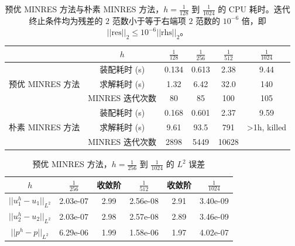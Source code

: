 \documentclass[lang=cn,11pt,a4paper]{elegantpaper}
\begin{document}
\begin{table}[H]
    \centering
    \begin{tabular}{c|ccccc}
    \hline
                                        & $h$               & $\frac{1}{128}$  & $\frac{1}{256}$ & $\frac{1}{512}$  & $\frac{1}{1024}$ \\ \hline
    \multirow{3}{*}{预优 MINRES 方法}    & 装配耗时 (s)     &   0.134   & 0.613            &   2.38   &  9.44              \\
                                        & 求解耗时 (s)       &   1.32   & 6.42            &   32.0   &  140              \\
                                        & MINRES 迭代次数        &   80   & 85             &   100   &  105             \\ \hline
    \multirow{3}{*}{朴素 MINRES 方法} & 装配耗时 (s)        &  0.168    & 0.601         &  2.37    &  9.59             \\
                                    & 求解耗时 (s)         &   9.61   &   93.5     &   791   &    >1h, killed   \\
                                    & MINRES 迭代次数          &   2898   &  5449     &   10628   &                \\ \hline
    \end{tabular}
    \caption{\small 预优 MINRES 方法与朴素 MINRES 方法，$h=\frac{1}{128}$ 到 $\frac{1}{1024}$ 的 CPU 耗时。迭代终止条件均为残差的 $2$ 范数小于等于右端项 $2$ 范数的 $10^{-6}$ 倍，即 $||\text{res}||_2\leq 10^{-6}||\text{rhs}||_2$。}
\end{table}

\begin{table}[H]
    \centering
    \begin{tabular}{cccccc}
    \hline
         $h$               & $\frac{1}{256}$ & 收敛阶  & $\frac{1}{512}$ & 收敛阶  & $\frac{1}{1024}$ \\ \hline
         $||u_1^h-u_1||_{L^2}$ & 2.03e-07        & 2.99 & 2.56e-08        & 2.91 & 3.40e-09         \\
         $||u_2^h-u_2||_{L^2}$ & 2.03e-07        & 2.98 & 2.57e-08        & 2.89 & 3.46e-09         \\
         $||p^h-p||_{L^2}$     & 6.29e-06        & 1.99 & 1.58e-06        & 1.97 & 4.02e-07         \\ \hline
    \end{tabular}
    \caption{\small 预优 MINRES 方法，$h=\frac{1}{256}$ 到 $\frac{1}{1024}$ 的 $L^2$ 误差}
\end{table}

\appendix
\addappheadtotoc
\end{document}
